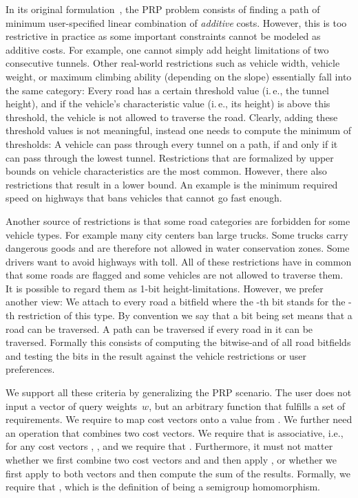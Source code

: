 \documentclass{sig-alternate}
\newcommand{\ie}{i.\,e.\xspace}
\newcommand{\queryweight}{\ensuremath{w}}
\begin{document}
In its original formulation~\cite{fns-opca-14}, the PRP problem  consists of finding a path of minimum user-specified linear combination of \emph{additive} costs.
However, this is too restrictive in practice as some important constraints cannot be modeled as additive costs.
For example, one cannot simply add height limitations of two consecutive tunnels.
Other real-world restrictions such as vehicle width, vehicle weight, or maximum climbing ability (depending on the slope) essentially fall into the same category: Every road has a certain threshold value (\ie, the tunnel height), and if the vehicle's characteristic value (\ie, its height) is above this threshold, the vehicle is not allowed to traverse the road.
Clearly, adding these threshold values is not meaningful, instead one needs to compute the minimum of thresholds: A vehicle can pass through every tunnel on a path, if and only if it can pass through the lowest tunnel.
Restrictions that are formalized by upper bounds on vehicle characteristics are the most common.
However, there also restrictions that result in a lower bound. An example is the minimum required speed on highways that bans vehicles that cannot go fast enough.


Another source of restrictions is that some road categories are forbidden for some vehicle types. 
For example many city centers ban large trucks. Some trucks carry dangerous goods and are therefore not allowed in water conservation zones. Some drivers want to avoid highways with toll.
All of these restrictions have in common that some roads are flagged and some vehicles are not allowed to traverse them.
It is possible to regard them as 1-bit height-limitations. 
However, we prefer another view: We attach to every road a bitfield where the -th bit stands for the -th restriction of this type.
By convention we say that a bit being set means that a road can be traversed.
A path can be traversed if every road in it can be traversed.
Formally this consists of computing the bitwise-and of all road bitfields and testing the bits in the result against the vehicle restrictions or user preferences.

We support all these criteria by generalizing the PRP scenario.
The user does not input a vector of query weights~\queryweight, but an arbitrary function  that fulfills a set of requirements.
We require  to map cost vectors onto a value from . 
We further need an operation  that combines two cost vectors. We require that  is associative, i.e., for any cost vectors , , and  we require that .  
Furthermore, it must not matter whether we first combine two cost vectors  and  and then apply , or whether we first apply  to both vectors and then compute the sum of the results. 
Formally, we require that , which is the definition of  being a semigroup homomorphism.
\end{document}
